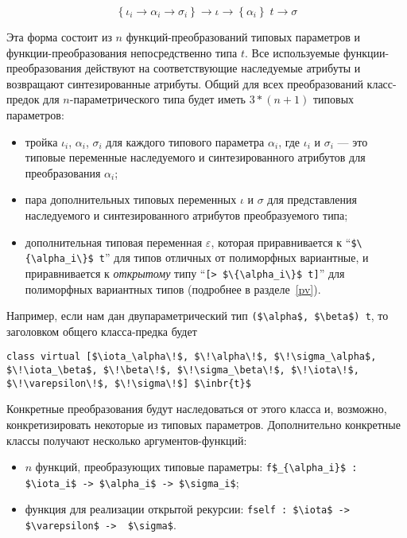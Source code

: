 \[
  \left\{\iota_i \to \alpha_i \to \sigma_i\right\}\to\iota \to\left\{\alpha_i\right\}\;t \to \sigma
\]

\noindent Эта форма состоит из $n$ функций-преобразований типовых параметров и функции-преобразования непосредственно типа  $t$. Все используемые функции-преобразования действуют на соответствующие наследуемые атрибуты и возвращают синтезированные атрибуты.
Общий для всех преобразований класс-предок для $n$-параметрического типа будет иметь $3*(n+1)$ типовых параметров:

\begin{itemize}
\item тройка $\iota_i$, $\alpha_i$, $\sigma_i$ для каждого типового параметра $\alpha_i$, где $\iota_i$ и $\sigma_i$ --- это типовые переменные наследуемого и синтезированного атрибутов для преобразования  $\alpha_i$;
\item пара дополнительных типовых переменных $\iota$ и $\sigma$ для представления наследуемого и синтезированного атрибутов преобразуемого типа;
\item дополнительная типовая переменная $\varepsilon$, которая приравнивается к ``\lstinline|$\{\alpha_i\}$ t|'' для типов отличных от полиморфных вариантные, и приравнивается к \emph{открытому} типу ``\lstinline|[> $\{\alpha_i\}$ t]|'' для полиморфных вариантных типов (подробнее в разделе~\ref{pv}).
\end{itemize}

\noindent Например, если нам дан двупараметрический тип \lstinline{($\alpha$, $\beta$) t}, то заголовком общего класса-предка будет 

\begin{lstlisting}
class virtual [$\iota_\alpha\!$, $\!\alpha\!$, $\!\sigma_\alpha$, $\!\iota_\beta$, $\!\beta\!$, $\!\sigma_\beta\!$, $\!\iota\!$, $\!\varepsilon\!$, $\!\sigma\!$] $\inbr{t}$
\end{lstlisting}

Конкретные преобразования будут наследоваться от этого класса и, возможно, конкретизировать некоторые из типовых параметров.
Дополнительно конкретные классы получают несколько аргументов-функций:

\begin{itemize}
\item $n$ функций, преобразующих типовые параметры: \lstinline|f$_{\alpha_i}$ : $\iota_i$ -> $\alpha_i$ -> $\sigma_i$|;
\item функция для реализации открытой рекурсии: \lstinline|fself : $\iota$ -> $\varepsilon$ ->  $\sigma$|.
\end{itemize}

